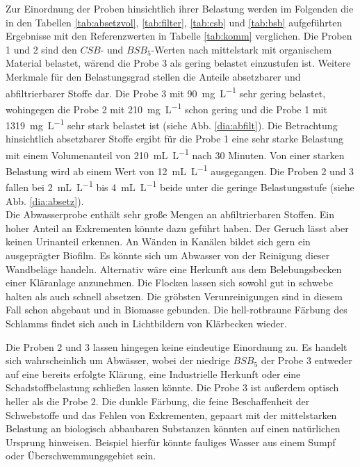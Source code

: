 \newpage
Zur Einordnung der Proben hinsichtlich ihrer Belastung werden im Folgenden die in den Tabellen \ref{tab:absetzvol}, \ref{tab:filter}, \ref{tab:csb} und \ref{tab:bsb} aufgeführten Ergebnisse mit den Referenzwerten in Tabelle \ref{tab:komm} verglichen.
Die Proben 1 und 2 sind den $CSB$- und $BSB_5$-Werten nach mittelstark mit organischem Material belastet, wärend die Probe 3 als gering belastet einzustufen ist.
Weitere Merkmale für den Belastungsgrad stellen die Anteile absetzbarer und abfiltrierbarer Stoffe dar. Die Probe 3 mit \SI{90}{\milli\gram\per\liter} sehr gering belastet, wohingegen die Probe 2 mit \SI{210}{\milli\gram\per\liter} schon gering und die Probe 1 mit \SI{1319}{\milli\gram\per\liter} sehr stark belastet ist (siehe Abb. \ref{dia:abfilt}).
Die Betrachtung hinsichtlich absetzbarer Stoffe ergibt für die Probe 1 eine sehr starke Belastung mit einem Volumenanteil von \SI{210}{\milli\liter\per\liter} nach 30 Minuten. Von einer starken Belastung wird ab einem Wert von \SI{12}{\milli\liter\per\liter} ausgegangen. Die Proben 2 und 3 fallen bei \SI{2}{\milli\liter\per\liter} bis \SI{4}{\milli\liter\per\liter} beide unter die geringe Belastungsstufe (siehe Abb. \ref{dia:absetz}).\\


Die Abwasserprobe enthält sehr große Mengen an abfiltrierbaren Stoffen. Ein hoher Anteil an Exkrementen könnte dazu geführt haben. Der Geruch lässt aber keinen Urinanteil erkennen. An Wänden in Kanälen bildet sich gern ein ausgeprägter Biofilm. Es könnte sich um Abwasser von der Reinigung dieser Wandbeläge handeln. Alternativ wäre eine Herkunft aus dem Belebungsbecken einer Kläranlage anzunehmen. Die Flocken lassen sich sowohl gut in schwebe halten als auch schnell absetzen. Die gröbsten Verunreinigungen sind in diesem Fall schon abgebaut und in Biomasse gebunden. Die hell-rotbraune Färbung des Schlamms findet sich auch in Lichtbildern von Klärbecken wieder.

Die Proben 2 und 3 lassen hingegen keine eindeutige Einordnung zu. Es handelt sich wahrscheinlich um Abwässer, wobei der niedrige $BSB_5$ der Probe 3 entweder auf eine bereits erfolgte Klärung, eine Industrielle Herkunft oder eine Schadstoffbelastung schließen lassen könnte. Die Probe 3 ist außerdem optisch heller als die Probe 2.
Die dunkle Färbung, die feine Beschaffenheit der Schwebstoffe und das Fehlen von Exkrementen, gepaart mit der mittelstarken Belastung an biologisch abbaubaren Substanzen könnten auf einen natürlichen Ursprung hinweisen. Beispiel hierfür könnte fauliges Wasser aus einem Sumpf oder Überschwemmungsgebiet sein.\\

